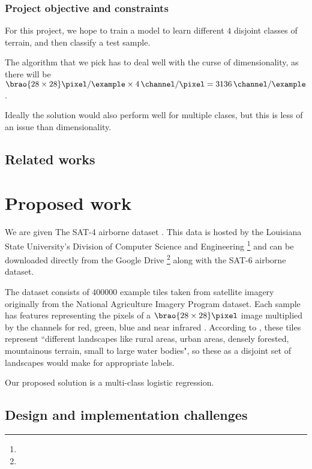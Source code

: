 \documentclass[11pt]{article}
\DeclarePairedDelimiter\brao()%
\begin{document}
\subsubsection{Project objective and constraints}

For this project, we hope to train a model to learn different \(4\) disjoint classes of terrain, and then classify a test sample.

The algorithm that we pick has to deal well with the curse of dimensionality,
as there will be
\(
    \SI[parse-numbers=false]{\brao{28\times28}\!}{\pixel\per\example}
    \times \SI4{\channel\per\pixel}
    = \SI{3136}{\channel\per\example}
\).

Ideally the solution would also perform well for multiple clases,
but this is less of an issue than dimensionality.

\subsection{Related works}

\section{Proposed work}

We are given
The SAT-4 airborne dataset%
\cite{Basu2015a}.
This data is hosted by the Louisiana State University's Division of Computer Science and Engineering%
\footnote{%
}
and can be downloaded directly from the Google Drive%
\footnote{%
}
along with the SAT-6 airborne dataset.

The dataset consists of \(\num{400000}\) example tiles
taken from satellite imagery originally from the National Agriculture Imagery Program  dataset.
Each sample has features representing the pixels of a \(\SI[parse-numbers=false]{\brao{28\times28}\!}\pixel\) image 
multiplied by the channels for red, green, blue and near infrared .
According to \textcite{Basu2015a},
these tiles represent ``different landscapes like rural areas, urban areas, densely forested, mountainous terrain, small to large water bodies",
so these as a disjoint set of landscapes would make for appropriate labels.

Our proposed solution is a multi-class logistic regression.

\subsection{Design and implementation challenges}
\end{document}

